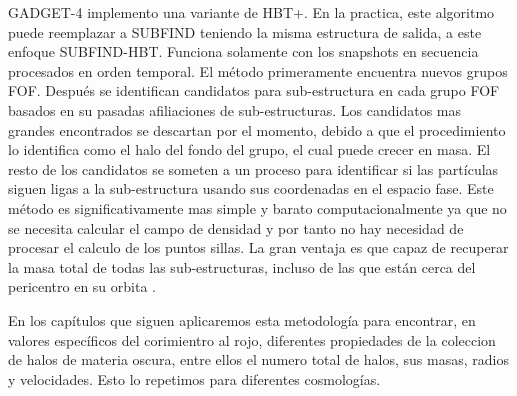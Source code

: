 GADGET-4 implemento una variante de HBT+. En la practica, este algoritmo puede reemplazar a SUBFIND teniendo la misma estructura de salida, a este enfoque SUBFIND-HBT. Funciona solamente con los snapshots en secuencia procesados en orden temporal. El método primeramente encuentra nuevos grupos FOF. Después se identifican candidatos para sub-estructura en cada grupo FOF basados en su pasadas afiliaciones de sub-estructuras. Los candidatos mas grandes encontrados se descartan por el momento, debido a que el procedimiento lo identifica como el halo del fondo del grupo, el cual puede crecer en masa. El resto de los candidatos se someten a un proceso para identificar si las partículas siguen ligas a la sub-estructura usando sus coordenadas en el espacio fase. Este método es significativamente mas simple y barato computacionalmente ya que no se necesita calcular el campo de densidad y por tanto no hay necesidad de procesar el calculo de los puntos sillas. La gran ventaja es que capaz de recuperar la masa total de todas las sub-estructuras, incluso de las que están cerca del pericentro en su orbita \cite{2021MNRAS.506.2871S}.

En los capítulos que siguen aplicaremos esta metodología para encontrar, en valores específicos del corimientro al rojo, diferentes propiedades de la coleccion de halos de materia oscura, entre ellos el numero total de halos, sus masas, radios y velocidades. Esto lo repetimos para diferentes cosmologías.